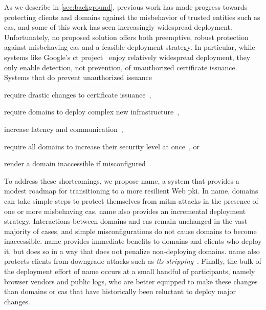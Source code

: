 As we describe in \autoref{sec:background}, previous work has made progress
towards protecting clients and domains against the misbehavior of trusted
entities such as \acp{ca}, and some of this work has seen increasingly
widespread deployment. Unfortunately, no proposed solution offers both
preemptive, robust protection against misbehaving \acp{ca} and a feasible
deployment strategy. In particular, while systems like Google's \ac{ct}
project~\cite{rfc6962,ct-laurie} enjoy relatively widespread deployment, they
only enable detection, not prevention, of unauthorized certificate issuance.
Systems that do prevent unauthorized issuance 
\begin{inparaenum}
\item require drastic changes to certificate issuance~\cite{kim2013accountable},
\item require domains to deploy complex new infrastructure~\cite{rfc6698,
  szalachowski2014policert},
\item increase latency and communication~\cite{yu2016dtki},
\item require all domains to increase their security level at
  once~\cite{basin2014arpki}, or
\item render a domain inaccessible if misconfigured~\cite{palmer2017intent}.
\end{inparaenum}

To address these shortcomings, we propose \ac{name}, a system that provides a
modest roadmap for transitioning to a more resilient Web \ac{pki}. 
In \ac{name}, domains can take simple steps to protect themselves from
\ac{mitm} attacks in the presence of one or more misbehaving \acp{ca}.
\ac{name} also provides an incremental deployment strategy. Interactions
between domains and \acp{ca} remain unchanged in the vast majority of cases, and
simple misconfigurations do not cause domains to become inaccessible. \ac{name}
provides immediate benefits to domains and clients who deploy it, but does so in
a way that does not penalize non-deploying domains. \ac{name} also protects
clients from downgrade attacks such as \emph{\ac{tls}
stripping}~\cite{marlinspike2009new}. Finally, the bulk of the
deployment effort of \ac{name} occurs at a small handful of participants,
namely browser vendors and public logs, who are better equipped to make these
changes than domains or \acp{ca} that have historically been reluctant to deploy
major changes.


